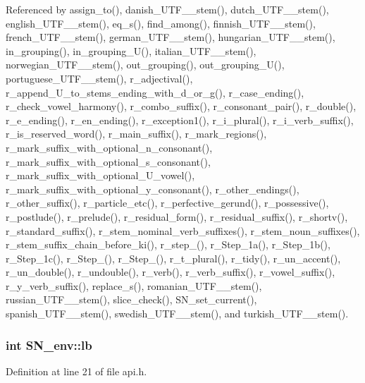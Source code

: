 Referenced by assign\_\-to(), danish\_\-UTF\_\_\-stem(), dutch\_\-UTF\_\_\-stem(), english\_\-UTF\_\_\-stem(), eq\_\-s(), find\_\-among(), finnish\_\-UTF\_\_\-stem(), french\_\-UTF\_\_\-stem(), german\_\-UTF\_\_\-stem(), hungarian\_\-UTF\_\_\-stem(), in\_\-grouping(), in\_\-grouping\_\-U(), italian\_\-UTF\_\_\-stem(), norwegian\_\-UTF\_\_\-stem(), out\_\-grouping(), out\_\-grouping\_\-U(), portuguese\_\-UTF\_\_\-stem(), r\_\-adjectival(), r\_\-append\_\-U\_\-to\_\-stems\_\-ending\_\-with\_\-d\_\-or\_\-g(), r\_\-case\_\-ending(), r\_\-check\_\-vowel\_\-harmony(), r\_\-combo\_\-suffix(), r\_\-consonant\_\-pair(), r\_\-double(), r\_\-e\_\-ending(), r\_\-en\_\-ending(), r\_\-exception1(), r\_\-i\_\-plural(), r\_\-i\_\-verb\_\-suffix(), r\_\-is\_\-reserved\_\-word(), r\_\-main\_\-suffix(), r\_\-mark\_\-regions(), r\_\-mark\_\-suffix\_\-with\_\-optional\_\-n\_\-consonant(), r\_\-mark\_\-suffix\_\-with\_\-optional\_\-s\_\-consonant(), r\_\-mark\_\-suffix\_\-with\_\-optional\_\-U\_\-vowel(), r\_\-mark\_\-suffix\_\-with\_\-optional\_\-y\_\-consonant(), r\_\-other\_\-endings(), r\_\-other\_\-suffix(), r\_\-particle\_\-etc(), r\_\-perfective\_\-gerund(), r\_\-possessive(), r\_\-postlude(), r\_\-prelude(), r\_\-residual\_\-form(), r\_\-residual\_\-suffix(), r\_\-shortv(), r\_\-standard\_\-suffix(), r\_\-stem\_\-nominal\_\-verb\_\-suffixes(), r\_\-stem\_\-noun\_\-suffixes(), r\_\-stem\_\-suffix\_\-chain\_\-before\_\-ki(), r\_\-step\_(), r\_\-Step\_\-1a(), r\_\-Step\_\-1b(), r\_\-Step\_\-1c(), r\_\-Step\_(), r\_\-Step\_(), r\_\-t\_\-plural(), r\_\-tidy(), r\_\-un\_\-accent(), r\_\-un\_\-double(), r\_\-undouble(), r\_\-verb(), r\_\-verb\_\-suffix(), r\_\-vowel\_\-suffix(), r\_\-y\_\-verb\_\-suffix(), replace\_\-s(), romanian\_\-UTF\_\_\-stem(), russian\_\-UTF\_\_\-stem(), slice\_\-check(), SN\_\-set\_\-current(), spanish\_\-UTF\_\_\-stem(), swedish\_\-UTF\_\_\-stem(), and turkish\_\-UTF\_\_\-stem().\hypertarget{structSN__env_17fa8ef44090bbfd74755377b15194a7}{
\subsubsection[{lb}]{\setlength{\rightskip}{0pt plus 5cm}int {\bf SN\_\-env::lb}}}
\label{structSN__env_17fa8ef44090bbfd74755377b15194a7}




Definition at line 21 of file api.h.


